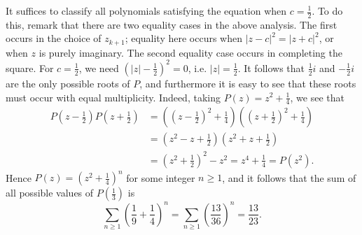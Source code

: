\documentclass[10pt]{article}
\begin{document}
\begin{enumerate}
\par It suffices to classify all polynomials satisfying the equation when $c=\tfrac12$.  To do this, remark that there are two equality cases in the above analysis.  The first occurs in the choice of $z_{k+1}$; equality here occurs when $|z-c|^2 = |z+c|^2$, or when $z$ is purely imaginary.  The second equality case occurs in completing the square.  For $c=\tfrac12$, we need $(|z|-\tfrac12)^2=0$, i.e. $|z|=\tfrac12$.  It follows that $\tfrac12i$ and $-\tfrac12i$ are the only possible roots of $P$, and furthermore it is easy to see that these roots must occur with equal multiplicity.  Indeed, taking $P(z) = z^2+\tfrac14$, we see that \begin{align*}P\left(z-\frac12\right)P\left(z+\frac12\right)&=\left(\left(z-\frac12\right)^2+\frac14\right)\left(\left(z+\frac12\right)^2+\frac14\right) \\&= \left(z^2-z+\frac12\right)\left(z^2+z+\frac12\right)\\&=\left(z^2+\frac12\right)^2-z^2 = z^4+\frac14 = P(z^2).\end{align*}  Hence $P(z) = (z^2+\tfrac14)^n$ for some integer $n\geq1$, and it follows that the sum of all possible values of $P(\tfrac13)$ is \[\sum_{n\geq 1}\left(\dfrac19+\frac14\right)^n = \sum_{n\geq 1}\left(\frac{13}{36}\right)^n = \boxed{\frac{13}{23}}.\]

\end{enumerate}
\end{document}
